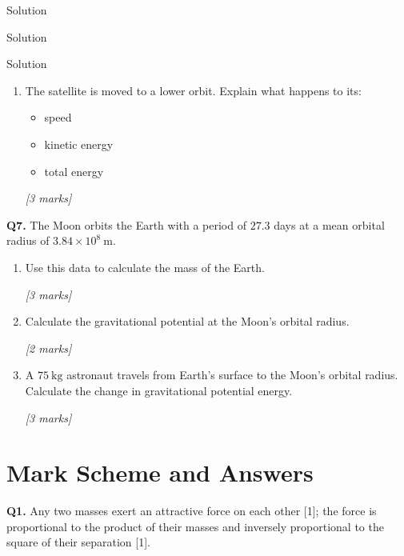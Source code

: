 \documentclass[12pt,a4paper]{article}
\begin{document}
\begin{examplebox}{Solution}
\begin{examplebox}{Solution}
\begin{examplebox}{Solution}
\begin{tcolorbox}[colback=white, colframe=midblue, breakable]
\begin{enumerate}[label=(\alph*)]
  \item \begin{minipage}[t]{\linewidth}
  The satellite is moved to a lower orbit. Explain what happens to its:
  \begin{itemize}
    \item speed
    \item kinetic energy
    \item total energy
  \end{itemize}
  \par\hfill\textit{[3 marks]}
  \vspace{4cm}
  \end{minipage}
\end{enumerate}

\begin{minipage}{\linewidth}
\textbf{Q7.} The Moon orbits the Earth with a period of $27.3$ days at a mean orbital radius of $3.84\times10^8\ \text{m}$.

\begin{enumerate}[label=(\alph*)]
  \item Use this data to calculate the mass of the Earth.
  \par\hfill\textit{[3 marks]}
  \vspace{4cm}

  \item Calculate the gravitational potential at the Moon's orbital radius.
  \par\hfill\textit{[2 marks]}
  \vspace{3.5cm}

  \item A $75\ \text{kg}$ astronaut travels from Earth's surface to the Moon's orbital radius. Calculate the change in gravitational potential energy.
  \par\hfill\textit{[3 marks]}
  \vspace{4cm}
\end{enumerate}
\end{minipage}

\end{tcolorbox}

\section{Mark Scheme and Answers}

\begin{markscheme}

\textbf{Q1.} Any two masses exert an attractive force on each other [1]; the force is proportional to the product of their masses and inversely proportional to the square of their separation [1].


\end{markscheme}
\end{examplebox}
\end{examplebox}
\end{examplebox}
\end{document}

